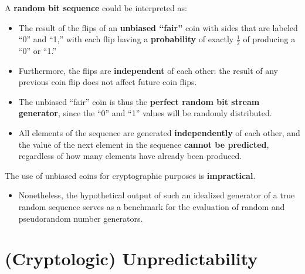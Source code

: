 \documentclass[12pt,openany]{book}
\theoremstyle{definition}
\begin{document}
A \textbf{random bit sequence} could be interpreted as:
\begin{itemize}
	\item The result of the flips of an \textbf{unbiased ``fair''} coin with sides that are labeled ``0'' and ``1,'' with each flip having a \textbf{probability} of exactly \( \frac{1}{2} \) of producing a ``0'' or ``1.''
	\item Furthermore, the flips are \textbf{independent} of each other: the result of any previous coin flip does not affect future coin flips.
	\item The unbiased ``fair'' coin is thus the \textbf{perfect random bit stream generator}, since the ``0'' and ``1'' values will be randomly distributed.
	\item All elements of the sequence are generated \textbf{independently} of each other, and the value of the next element in the sequence \textbf{cannot be predicted}, regardless of how many elements have already been produced.
\end{itemize}
The use of unbiased coins for cryptographic purposes is \textbf{impractical}.
\begin{itemize}
	\item Nonetheless, the hypothetical output of such an idealized generator of a true random sequence serves as a benchmark for the evaluation of random and pseudorandom number generators.
\end{itemize}

\section{(Cryptologic) Unpredictability}
\end{document}
